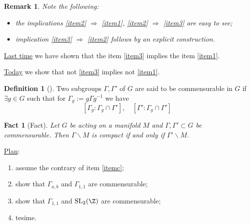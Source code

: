 \documentclass[a4paper,12pt]{article}
\newtheorem{remark}{Remark}
\newtheorem{fact}{Fact}
\theoremstyle{definition}
\newtheorem{definition}{Definition}
\renewcommand{\implies}{\Rightarrow}
\begin{document}
\begin{remark}
	Note the following:\begin{itemize}
		\item the implications \ref{item2} $\implies$ \ref{item1}, \ref{item2} $\implies$ \ref{item3} are easy to see;
		\item implication \ref{item3} $\implies$ \ref{item2} follows by an explicit construction.
	\end{itemize}
\end{remark}

\underline{Last time} we have shown that the item \ref{item3} implies the item \ref{item1}.

\underline{Today} we show that not \ref{item3} implies not \ref{item1}.

\begin{definition}[{\cite[p.36]{bergeron2016spectrum}}]
	Two subgroups $\Gamma,\Gamma'$ of $G$ are said to be commensurable in $G$ if $\exists g\in G$ such that for $\Gamma_{g}:=g\Gamma g^{-1}$ we have\begin{equation*}
		\left[  \Gamma_g:\Gamma_g
		\cap \Gamma'\right],\quad \left[ \Gamma':\Gamma_g\cap \Gamma' \right]
	\end{equation*}
\end{definition}

\begin{fact}[Fact]
	Let $G$ be acting on a manifold $M$ and $\Gamma,\Gamma'\subset G$ be commensurable. Then $\Gamma\backslash M$ is compact if and only if $\Gamma'\backslash M$.
\end{fact}

\underline{Plan}:\begin{enumerate}
	\item assume the contrary of item \ref{itemc};
	\item show that $\Gamma_{a,b}$ and $\Gamma_{1,1}$ are commensurable;
	\item show that $\Gamma_{1,1}$ and $\mbox{\normalfont SL}_2(\Z)$ are commensurable;
	\item tesime. 
\end{enumerate}



\end{document}
